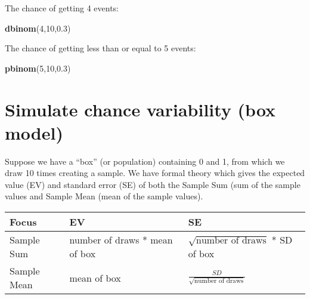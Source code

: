 \documentclass[]{article}
\newenvironment{Shaded}{\begin{snugshade}}{\end{snugshade}}
\newcommand{\DecValTok}[1]{\textcolor[rgb]{0.00,0.00,0.81}{#1}}
\newcommand{\FloatTok}[1]{\textcolor[rgb]{0.00,0.00,0.81}{#1}}
\newcommand{\KeywordTok}[1]{\textcolor[rgb]{0.13,0.29,0.53}{\textbf{#1}}}
\newcommand{\NormalTok}[1]{#1}
\begin{document}
The chance of getting 4 events:

\begin{Shaded}
\begin{Highlighting}[]
\KeywordTok{dbinom}\NormalTok{(}\DecValTok{4}\NormalTok{,}\DecValTok{10}\NormalTok{,}\FloatTok{0.3}\NormalTok{)}
\end{Highlighting}
\end{Shaded}

The chance of getting less than or equal to 5 events:

\begin{Shaded}
\begin{Highlighting}[]
\KeywordTok{pbinom}\NormalTok{(}\DecValTok{5}\NormalTok{,}\DecValTok{10}\NormalTok{,}\FloatTok{0.3}\NormalTok{)}
\end{Highlighting}
\end{Shaded}

\hypertarget{boxmodel}{%
\section{Simulate chance variability (box model)}\label{boxmodel}}

Suppose we have a ``box'' (or population) containing 0 and 1, from which we draw 10 times creating a sample. We have formal theory which gives the expected value (EV) and standard error (SE) of both the Sample Sum (sum of the sample values and Sample Mean (mean of the sample values).

\begin{longtable}[]{@{}lll@{}}
\toprule
\begin{minipage}[b]{0.20\columnwidth}\raggedright
Focus\strut
\end{minipage} & \begin{minipage}[b]{0.33\columnwidth}\raggedright
EV\strut
\end{minipage} & \begin{minipage}[b]{0.38\columnwidth}\raggedright
SE\strut
\end{minipage}\tabularnewline
\midrule
\endhead
\begin{minipage}[t]{0.20\columnwidth}\raggedright
Sample Sum\strut
\end{minipage} & \begin{minipage}[t]{0.33\columnwidth}\raggedright
number of draws * mean of box\strut
\end{minipage} & \begin{minipage}[t]{0.38\columnwidth}\raggedright
\(\sqrt{\mbox{number of draws}}\) * SD of box\strut
\end{minipage}\tabularnewline
\begin{minipage}[t]{0.20\columnwidth}\raggedright
Sample Mean\strut
\end{minipage} & \begin{minipage}[t]{0.33\columnwidth}\raggedright
mean of box\strut
\end{minipage} & \begin{minipage}[t]{0.38\columnwidth}\raggedright
\(\frac{SD}{\sqrt{\mbox{number of draws}}}\)\strut
\end{minipage}\tabularnewline
\bottomrule
\end{longtable}
\end{document}
